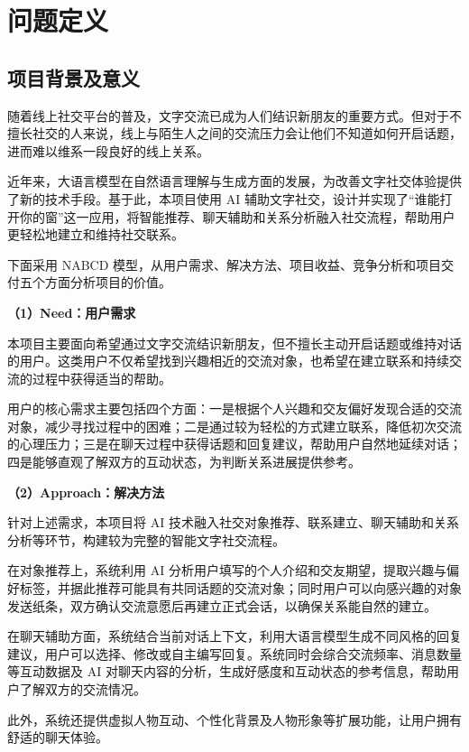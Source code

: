 
\chapter{问题定义}
\label{chap:problem}

\section{项目背景及意义}

随着线上社交平台的普及，文字交流已成为人们结识新朋友的重要方式。但对于不擅长社交的人来说，线上与陌生人之间的交流压力会让他们不知道如何开启话题，进而难以维系一段良好的线上关系。

近年来，大语言模型在自然语言理解与生成方面的发展，为改善文字社交体验提供了新的技术手段。基于此，本项目使用 AI 辅助文字社交，设计并实现了“谁能打开你的窗”这一应用，将智能推荐、聊天辅助和关系分析融入社交流程，帮助用户更轻松地建立和维持社交联系。

下面采用 NABCD 模型，从用户需求、解决方法、项目收益、竞争分析和项目交付五个方面分析项目的价值。


\noindent\textbf{（1）Need：用户需求}

本项目主要面向希望通过文字交流结识新朋友，但不擅长主动开启话题或维持对话的用户。这类用户不仅希望找到兴趣相近的交流对象，也希望在建立联系和持续交流的过程中获得适当的帮助。

用户的核心需求主要包括四个方面：一是根据个人兴趣和交友偏好发现合适的交流对象，减少寻找过程中的困难；二是通过较为轻松的方式建立联系，降低初次交流的心理压力；三是在聊天过程中获得话题和回复建议，帮助用户自然地延续对话；四是能够直观了解双方的互动状态，为判断关系进展提供参考。

\noindent\textbf{（2）Approach：解决方法}

针对上述需求，本项目将 AI 技术融入社交对象推荐、联系建立、聊天辅助和关系分析等环节，构建较为完整的智能文字社交流程。

在对象推荐上，系统利用 AI 分析用户填写的个人介绍和交友期望，提取兴趣与偏好标签，并据此推荐可能具有共同话题的交流对象；同时用户可以向感兴趣的对象发送纸条，双方确认交流意愿后再建立正式会话，以确保关系能自然的建立。

在聊天辅助方面，系统结合当前对话上下文，利用大语言模型生成不同风格的回复建议，用户可以选择、修改或自主编写回复。系统同时会综合交流频率、消息数量等互动数据及 AI 对聊天内容的分析，生成好感度和互动状态的参考信息，帮助用户了解双方的交流情况。

此外，系统还提供虚拟人物互动、个性化背景及人物形象等扩展功能，让用户拥有舒适的聊天体验。

